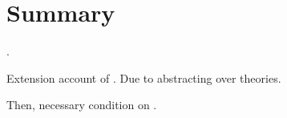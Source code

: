\section{Summary}
\label{cha:typical:sec:summ}

\begin{note}
  .

  Extension account of \tor{}.
  Due to abstracting over theories.

  Then, necessary condition on \tR{}.
\end{note}








